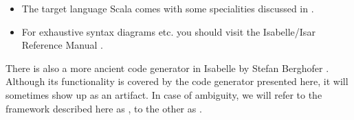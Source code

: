 \begin{isabellebody}
\begin{isamarkuptext}
\begin{itemize}
    \item The target language Scala \cite{scala-overview-tech-report}
      comes with some specialities discussed in .

    \item For exhaustive syntax diagrams etc. you should visit the
      Isabelle/Isar Reference Manual \cite{isabelle-isar-ref}.

  \end{itemize}

  \bigskip

  \begin{center}\end{center}

  \begin{warn}
    There is also a more ancient code generator in Isabelle by Stefan
    Berghofer \cite{Berghofer-Nipkow:2002}.  Although its
    functionality is covered by the code generator presented here, it
    will sometimes show up as an artifact.  In case of ambiguity, we
    will refer to the framework described here as , to the other as .
  \end{warn}%
\end{isamarkuptext}%
\isamarkuptrue%
%
\isadelimtheory
%
\endisadelimtheory
%
\isatagtheory
{}\isamarkupfalse%
%
\endisatagtheory
{\isafoldtheory}%
%
\isadelimtheory
%
\endisadelimtheory
\isanewline
\end{isabellebody}%

